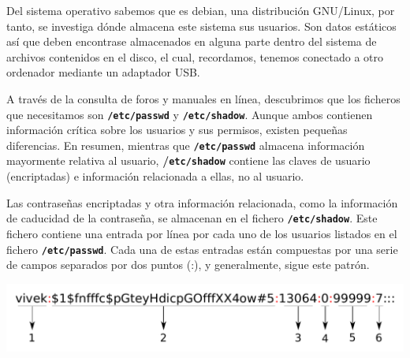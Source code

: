 Del sistema operativo sabemos que es \gls{debian}, una distribución \gls{GNU/Linux}, por tanto, se investiga dónde almacena este sistema sus usuarios. Son datos estáticos así que deben encontrase almacenados en alguna parte dentro del sistema de archivos contenidos en el disco, el cual, recordamos, tenemos conectado a otro ordenador mediante un adaptador \acrshort{USB}.

A través de la consulta de foros \cite{debian-passwords} y manuales \cite{debian-manuals} en línea, descubrimos que los ficheros que necesitamos son \textbf{\texttt{/etc/passwd}} y \textbf{\texttt{/etc/shadow}}. Aunque ambos contienen información crítica sobre los usuarios y sus permisos, existen pequeñas diferencias. En resumen, mientras que \textbf{\texttt{/etc/passwd}} almacena información mayormente relativa al usuario, \textbf{/\texttt{etc/shadow}} contiene las claves de usuario (encriptadas) e información relacionada a ellas, no al usuario.

Las contraseñas encriptadas y otra información relacionada, como la información de caducidad de la contraseña, se almacenan en el fichero \textbf{\texttt{/etc/shadow}}. Este fichero contiene una entrada por línea por cada uno de los usuarios listados en el fichero \textbf{\texttt{/etc/passwd}}. Cada una de estas entradas están compuestas por una serie de campos separados por dos puntos (:), y generalmente, sigue este patrón.

\begin{center}
    \includegraphics[scale=0.5]{figuras/shadow.pdf}
    \label{fig:shadow}
\end{center}

